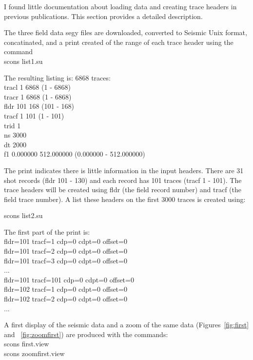 I found little documentation about loading data and creating trace
headers in previous publications.  This section provides a detailed
description.

The three field data segy files are downloaded, converted to Seismic 
Unix format, concatinated, and a print created of the range of each trace 
header using the command\\

scons list1.su

The resulting listing is:
6868 traces:\\
tracl    1 6868 (1 - 6868)\\
tracr    1 6868 (1 - 6868)\\
fldr     101 168 (101 - 168)\\
tracf    1 101 (1 - 101)\\
trid     1\\
ns       3000\\
dt       2000\\
f1       0.000000 512.000000 (0.000000 - 512.000000)

The print indicates there is little information in the input headers.
There are 31 shot records (fldr 101 - 130) and each record has 101
traces (tracf 1 - 101).  The trace headers will be created using fldr
(the field record number) and tracf (the field trace number).  A list 
these headers on the first 3000 traces is created using:

scons list2.su 

The first part of the print is: \\
fldr=101 tracf=1  cdp=0	 cdpt=0  offset=0 \\
fldr=101 tracf=2  cdp=0	 cdpt=0  offset=0 \\	
fldr=101 tracf=3  cdp=0  cdpt=0  offset=0 \\
... \\
fldr=101 tracf=101  cdp=0  cdpt=0  offset=0 \\
fldr=102 tracf=1    cdp=0  cdpt=0  offset=0 \\
fldr=102 tracf=2    cdp=0  cdpt=0  offset=0 \\
...

A first display of the seismic data and a zoom of the same data 
(Figures~\ref{fig:first} and ~\ref{fig:zoomfirst}) are
produced with the commands: \\
scons first.view \\
scons zoomfirst.view


